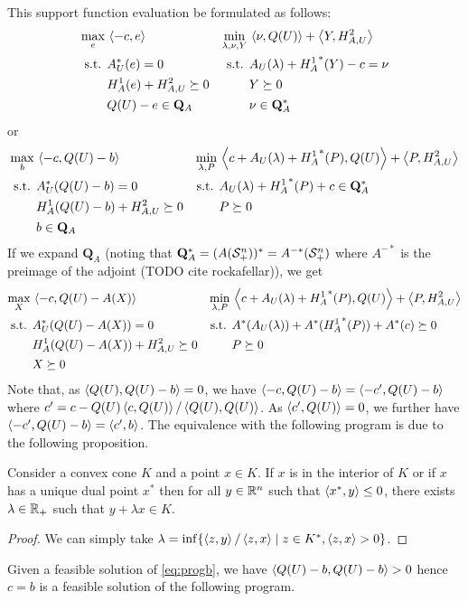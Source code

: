 \documentclass[11pt]{article}
\newcommand{\error}{e}
\newcommand{\APsd}{\mathbf{Q}_A}
\begin{document}
This support function evaluation be formulated as follows:
\begin{align*}
  \max_{e} \, & \dotp{-c, \error} &
  \min_{\lambda, \nu, Y} \, & \dotp{\nu, Q(U)} + \dotp{Y, H^2_{A, U}} \\
  \text{s.t. } & A_U^*(\error) = 0  &
  \text{s.t. } & A_U(\lambda) + {H^1_A}^*(Y) - c = \nu \\
         & H^1_A(\error) + H^2_{A, U} \succeq 0 &
         & Y \succeq 0\\
         & Q(U) - \error \in \APsd &
         & \nu \in \APsd^*
\end{align*}
or
\begin{align}
  \label{eq:progb}
  \max_{b} \, & \dotp{-c, Q(U) - b} &
  \min_{\lambda, P} \, & \dotp{c + A_U(\lambda) + {H^1_A}^*(P), Q(U)} + \dotp{P, H^2_{A, U}} \\
  \notag
  \text{s.t. } & A_U^*(Q(U) - b) = 0  &
  \text{s.t. } & A_U(\lambda) + {H^1_A}^*(P) + c \in \APsd^*\\
  \notag
         & H^1_A(Q(U) - b) + H^2_{A, U} \succeq 0 &
         & P \succeq 0\\
  \notag
         & b \in \APsd\\
\end{align}
If we expand $\APsd$ (noting that $\APsd^* = (A(\Psd))^* = A^{-*}(\Psd)$ where $A^{-*}$ is the preimage of the adjoint (TODO cite rockafellar)), we get
\begin{align*}
  \max_{X} \, & \left\langle -c, Q(U) - A(X) \right\rangle &
  \min_{\lambda, P} \, & \left\langle c + A_U(\lambda) + {H^1_A}^*(P), Q(U) \right\rangle + \left\langle P, H^2_{A, U} \right\rangle \\
  \text{s.t. } & A_U^*(Q(U) - A(X)) = 0  &
  \text{s.t. } & A^*(A_U(\lambda)) + A^*({H^1_A}^*(P)) + A^*(c) \succeq 0\\
         & H^1_A(Q(U) - A(X)) + H^2_{A, U} \succeq 0 &
         & P \succeq 0 \\
         & X \succeq 0
\end{align*}
Note that, as $\left\langle Q(U), Q(U) - b \right\rangle = 0$, we have $\left\langle -c, Q(U) - b \right\rangle = \left\langle -c', Q(U) - b \right\rangle$ where $c' = c - Q(U) \left\langle c, Q(U) \right\rangle / \left\langle Q(U), Q(U) \right\rangle$.
As $\left\langle c', Q(U) \right\rangle = 0$, we further have $\left\langle -c', Q(U) - b \right\rangle = \left\langle c', b \right\rangle$.
The equivalence with the following program is due to the following proposition.
\begin{proposition}
  Consider a convex cone $K$ and a point $x \in K$.
  If $x$ is in the interior of $K$ or if $x$ has a unique dual point $x^*$ then
  for all $y \in \mathbb{R}^n$ such that $\left\langle x^*, y \right\rangle \le 0$,
  there exists $\lambda \in \mathbb{R}_+$ such that
  $y + \lambda x \in K$.
  \begin{proof}
    We can simply take $\lambda = \inf \{\left\langle z, y \right\rangle / \left\langle z, x \right\rangle \mid z \in K^*, \left\langle z, x \right\rangle > 0\}$.
  \end{proof}
\end{proposition}
Given a feasible solution of \cref{eq:progb},
we have $\left\langle Q(U) - b, Q(U) - b \right\rangle > 0$ hence $c = b$ is a feasible solution of the following program.
\end{document}
